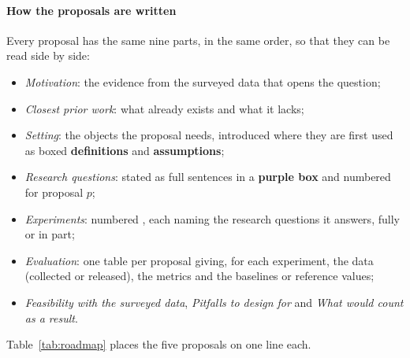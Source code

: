 \paragraph{How the proposals are written} Every proposal has the same nine parts, in the same order, so that they can be read side by side:
\begin{itemize}[leftmargin=1.1em]
\item \emph{Motivation}: the evidence from the surveyed data that opens the question;
\item \emph{Closest prior work}: what already exists and what it lacks;
\item \emph{Setting}: the objects the proposal needs, introduced where they are first used as boxed \textcolor{s1!65!black}{\textbf{definitions}} and \textcolor{warning!60!black}{\textbf{assumptions}};
\item \emph{Research questions}: stated as full sentences in a \textcolor{s7!65!black}{\textbf{purple box}} and numbered  for proposal $p$;
\item \emph{Experiments}: numbered , each naming the research questions it answers, fully or in part;
\item \emph{Evaluation}: one table per proposal giving, for each experiment, the data (collected or released), the metrics and the baselines or reference values;
\item \emph{Feasibility with the surveyed data}, \emph{Pitfalls to design for} and \emph{What would count as a result}.
\end{itemize}
Table~\ref{tab:roadmap} places the five proposals on one line each.

